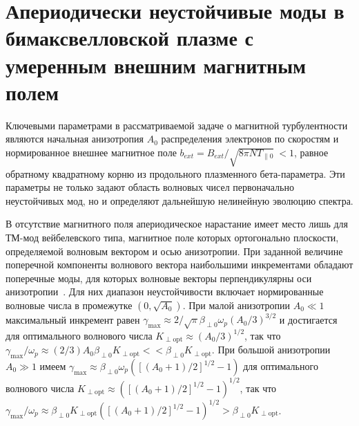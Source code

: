 \section{Апериодически неустойчивые моды в бимаксвелловской плазме с умеренным внешним магнитным полем}
\label{section_linear_theory}

Ключевыми параметрами в рассматриваемой задаче о магнитной турбулентности являются начальная анизотропия $A_0$ распределения электронов по скоростям и нормированное внешнее магнитное поле $b_{ext}=B_{ext}/\sqrt{8\pi N T_{\|0}}\ <1$, равное обратному квадратному корню из продольного плазменного бета-параметра. Эти параметры не только задают область волновых чисел первоначально неустойчивых мод, но и определяют дальнейшую нелинейную эволюцию спектра. 

В отсутствие магнитного поля апериодическое нарастание имеет место лишь для ТМ-мод вейбелевского типа, магнитное поле которых ортогонально плоскости, определяемой волновым вектором и осью анизотропии. При заданной величине поперечной компоненты волнового вектора наибольшими инкрементами обладают поперечные моды, для которых волновые векторы перпендикулярны оси анизотропии~\cite{Kocharovsky2016,Vagin2014}. Для них диапазон неустойчивости включает нормированные волновые числа в промежутке $\left(0,\sqrt{A_0}\right)$. При малой анизотропии $A_0\ll1$ максимальный инкремент равен $\gamma_\mathrm{max}\approx 2/\sqrt{\pi} \beta_{\perp0} \omega_p (A_0 / 3)^{3/2}$ и достигается для оптимального волнового числа $K_\mathrm{\perp opt} \approx (A_0 / 3)^{1/2}$, так что $\gamma_\mathrm{max} /\omega_p\approx (2/3)A_0 \beta_{\perp0} K_\mathrm{\perp opt} << \beta_{\perp0} K_\mathrm{\perp opt}$. При большой анизотропии $A_0 \gg 1$ имеем 
$\gamma_\mathrm{max} \approx \beta_{\perp0} \omega_p \left( \left[ (A_0+1)/2 \right]^{1/2} - 1 \right)$ для оптимального волнового числа $K_\mathrm{\perp opt} \approx \left( \left[ (A_0+1)/2 \right]^{1/2} - 1 \right)^{1/2}$, так что $\gamma_\mathrm{max} /\omega_p\approx \beta_{\perp0} K_\mathrm{\perp opt} \left( \left[ (A_0+1)/2 \right]^{1/2} - 1 \right)^{1/2} > \beta_{\perp0} K_\mathrm{\perp opt}$.

